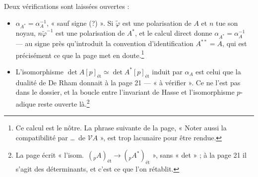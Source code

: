 \documentclass[11pt,a4paper]{article}
\begin{document}
Deux vérifications sont laissées ouvertes :
\begin{itemize}
\item[c)] $\alpha_{A^*} = \alpha_A^{-1}$, « sauf signe (?) ». Si $\tilde\varphi$ est
une polarisation de $A$ et $n$ tue son noyau, $n\tilde\varphi^{-1}$ est une
polarisation de $A^*$, et le calcul direct donne $\alpha_{A^*} =
\alpha_A^{-1}$ --- au signe près qu'introduit la convention d'identification
$A^{**} = A$, qui est précisément ce que la page met en doute.\footnote{Ce
calcul est le nôtre. La phrase suivante de la page, « Noter aussi la
compatibilité par \ldots\ de $\mathcal{V}A$ », est trop lacunaire pour être
rendue.}
\item[d)] L'isomorphisme $\det A[p]_{\text{ét}} \simeq \det
A^*[p]_{\text{ét}}$ induit par $\alpha_A$ est celui que la dualité de De Rham
donnait à la page 21 --- « à vérifier ». Ce ne l'est pas dans le dossier, et
la boucle entre l'invariant de Hasse et l'isomorphisme $p$-adique reste
ouverte là.\footnote{La page écrit « l'isom.\ $({}_pA)_{\text{ét}} \to
({}_pA^*)_{\text{ét}}$ », sans « det » ; à la page 21 il s'agit des
déterminants, et c'est ce que l'on rétablit.}
\end{itemize}
\end{document}
